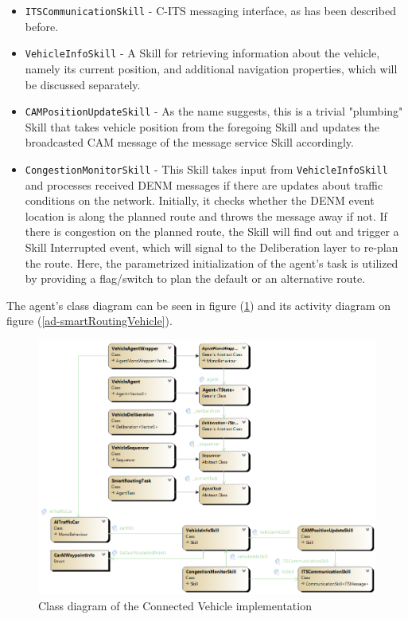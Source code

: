 \documentclass[main.tex]{subfiles}
\begin{document}
\begin{itemize}
    \item \texttt{ITSCommunicationSkill} - C-ITS messaging interface, as has been described before.
    \item \texttt{VehicleInfoSkill} - A Skill for retrieving information about the vehicle, namely 
    its current position, and additional navigation properties, which will be discussed separately.
    \item \texttt{CAMPositionUpdateSkill} - As the name suggests, this is a trivial "plumbing" Skill 
    that takes vehicle position from the foregoing Skill and updates the broadcasted CAM message of 
    the message service Skill accordingly.
    \item \texttt{CongestionMonitorSkill} - This Skill takes input from \texttt{VehicleInfoSkill} and 
    processes received DENM messages if there are updates about traffic conditions on the network. 
    Initially, it checks whether the DENM event location is along the planned route and throws the 
    message away if not. If there is congestion on the planned route, the Skill will find out and 
    trigger a Skill Interrupted event, which will signal to the Deliberation layer to re-plan the route. 
    Here, the parametrized initialization of the agent's task is utilized by providing a flag/switch to 
    plan the default or an alternative route. 
\end{itemize}

The agent's class diagram can be seen in figure (\ref{cd-smartRoutingVehicle}) and its activity diagram 
on figure (\ref{ad-smartRoutingVehicle}).

\begin{figure}[htbp]
    \centering
    \includegraphics[width=.9\textwidth]{cd-SmartRoutingAgent.png}
    \caption{Class diagram of the Connected Vehicle implementation}
    \label{cd-smartRoutingVehicle}
\end{figure}
\end{document}
